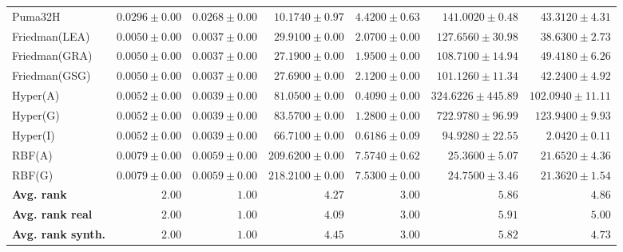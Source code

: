 \begin{table*}[!htbp]
{\begin{tabular}{lrrrrrr}
		Puma32H & $0.0296 \pm 0.00$ & $\mathbf{0.0268 \pm 0.00}$ & $10.1740 \pm 0.97$ & $4.4200 \pm 0.63$ & $141.0020 \pm 0.48$ & $43.3120 \pm 4.31$\\
		Friedman(LEA) & $0.0050 \pm 0.00$ & $\mathbf{0.0037 \pm 0.00}$ & $29.9100 \pm 0.00$ & $2.0700 \pm 0.00$ & $127.6560 \pm 30.98$ & $38.6300 \pm 2.73$\\
		Friedman(GRA) & $0.0050 \pm 0.00$ & $\mathbf{0.0037 \pm 0.00}$ & $27.1900 \pm 0.00$ & $1.9500 \pm 0.00$ & $108.7100 \pm 14.94$ & $49.4180 \pm 6.26$\\
		Friedman(GSG) & $0.0050 \pm 0.00$ & $\mathbf{0.0037 \pm 0.00}$ & $27.6900 \pm 0.00$ & $2.1200 \pm 0.00$ & $101.1260 \pm 11.34$ & $42.2400 \pm 4.92$\\
		Hyper(A) & $0.0052 \pm 0.00$ & $\mathbf{0.0039 \pm 0.00}$ & $81.0500 \pm 0.00$ & $0.4090 \pm 0.00$ & $324.6226 \pm 445.89$ & $102.0940 \pm 11.11$\\
		Hyper(G) & $0.0052 \pm 0.00$ & $\mathbf{0.0039 \pm 0.00}$ & $83.5700 \pm 0.00$ & $1.2800 \pm 0.00$ & $722.9780 \pm 96.99$ & $123.9400 \pm 9.93$\\
		Hyper(I) & $0.0052 \pm 0.00$ & $\mathbf{0.0039 \pm 0.00}$ & $66.7100 \pm 0.00$ & $0.6186 \pm 0.09$ & $94.9280 \pm 22.55$ & $2.0420 \pm 0.11$\\
		RBF(A) & $0.0079 \pm 0.00$ & $\mathbf{0.0059 \pm 0.00}$ & $209.6200 \pm 0.00$ & $7.5740 \pm 0.62$ & $25.3600 \pm 5.07$ & $21.6520 \pm 4.36$\\
		RBF(G) & $0.0079 \pm 0.00$ & $\mathbf{0.0059 \pm 0.00}$ & $218.2100 \pm 0.00$ & $7.5300 \pm 0.00$ & $24.7500 \pm 3.46$ & $21.3620 \pm 1.54$\\
		\midrule
		\textbf{{Avg. rank}} & $2.00$ & $\mathbf{1.00}$ & $4.27$ & $3.00$ & $5.86$ & $4.86$\\
		\textbf{{Avg. rank real}} & $2.00$ & $\mathbf{1.00}$ & $4.09$ & $3.00$ & $5.91$ & $5.00$\\
		\textbf{{Avg. rank synth.}} & $2.00$ & $\mathbf{1.00}$ & $4.45$ & $3.00$ & $5.82$ & $4.73$\\
		\bottomrule
	\end{tabular}}
\end{table*}
